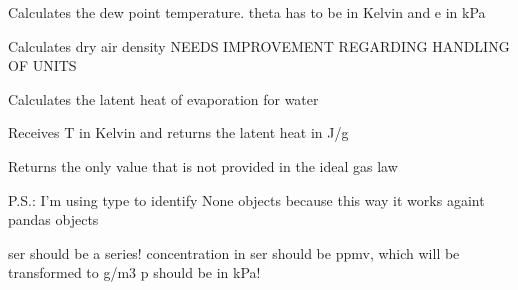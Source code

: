 \documentclass[a4paper,10pt,oneside]{sphinxmanual}
\begin{document}

\begin{fulllineitems}
\label{pymicra:pymicra.physics.dewPointTemp}
Calculates the dew point temperature.
theta has to be in Kelvin and e in kPa

\end{fulllineitems}


\begin{fulllineitems}
\label{pymicra:pymicra.physics.dryAirDensity_from_p}
Calculates dry air density
NEEDS IMPROVEMENT REGARDING HANDLING OF UNITS

\end{fulllineitems}


\begin{fulllineitems}
\label{pymicra:pymicra.physics.latent_heat_water}
Calculates the latent heat of evaporation for water

Receives T in Kelvin and returns the latent heat in J/g

\end{fulllineitems}


\begin{fulllineitems}
\label{pymicra:pymicra.physics.perfGas}
Returns the only value that is not provided in the ideal gas law

P.S.: I'm using type to identify None objects because this way it works
againt pandas objects

\end{fulllineitems}


\begin{fulllineitems}
\label{pymicra:pymicra.physics.ppxv2density}
ser should be a series!
concentration in ser should be ppmv, which will be transformed to g/m3
p should be in kPa!

\end{fulllineitems}
\end{document}
